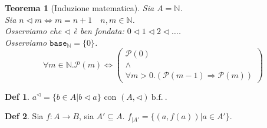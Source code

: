\documentclass[a4paper]{report}
\newcommand{\bnfn}{\ \mathrm{b.f.}\ }
\newcommand{\prop}{\mathcal{P}}
\newcommand{\base}[1]{\mathtt{base}_{#1}}
\theoremstyle{definition} \newtheorem*{defi}{Def}
\theoremstyle{plain} \newtheorem{lemma}{Lemma}
\theoremstyle{plain} \newtheorem{teo}{Teorema}
\theoremstyle{remark} \newtheorem*{es}{Esempio}
\begin{document}
\begin{teo}[Induzione matematica]
  Sia $A=\mathbb{N}$.\\
  Sia $n \lhd m \Leftrightarrow m=n+1 \quad n,m \in \mathbb{N}$.\\
  Osserviamo che $\lhd$ è ben fondata: $0\lhd1\lhd2\lhd\dots$.\\
  Osserviamo $\base{\mathbb{N}}=\{0\}$.
  \[
    \forall m \in \mathbb{N}.\prop(m) \Leftrightarrow
    \begin{pmatrix}
      \prop(0)\\
      \wedge\\
      \forall m > 0
      .(\prop(m-1) \Rightarrow \prop(m))
    \end{pmatrix}
  \]
\end{teo}

\begin{defi}
  $a^\lhd=\{b \in A|b \lhd a\}$ con $(A,\lhd)\bnfn$.
\end{defi}
\begin{defi}
  Sia $f: A \rightarrow B$, sia $A' \subseteq A$.
  $f_{|A'}=\{(a, f(a))|a \in A'\}$.
\end{defi}
\end{document}
